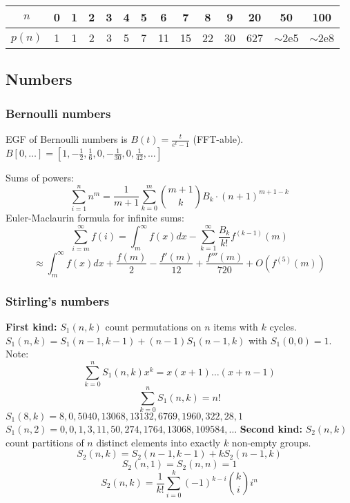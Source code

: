 \documentclass[
	a4paper,
	landscape,
	10pt,
]{article}
\begin{document}
\begin{multicols}{3}
		\begin{center}
		\begin{tabular}{c|c@{\ }c@{\ }c@{\ }c@{\ }c@{\ }c@{\ }c@{\ }c@{\ }c@{\ }c@{\ }c@{\ }c@{\ }c}
			$n$    & 0 & 1 & 2 & 3 & 4 & 5 & 6  & 7  & 8  & 9  & 20  & 50  & 100 \\ \hline
			$p(n)$ & 1 & 1 & 2 & 3 & 5 & 7 & 11 & 15 & 22 & 30 & 627 & $\mathtt{\sim}$2e5 & $\mathtt{\sim}$2e8 \\
		\end{tabular}
		\end{center}
	
	\subsection{Numbers}
	\subsubsection*{Bernoulli numbers}
		EGF of Bernoulli numbers is $B(t)=\frac{t}{e^t-1}$ (FFT-able).
		$B[0,\ldots] = [1, -\frac{1}{2}, \frac{1}{6}, 0, -\frac{1}{30}, 0, \frac{1}{42}, \ldots]$

		Sums of powers:
		\small
		\[ \sum_{i=1}^n n^m = \frac{1}{m+1} \sum_{k=0}^m \binom{m+1}{k} B_k \cdot (n+1)^{m+1-k} \]
		\normalsize
		Euler-Maclaurin formula for infinite sums:
		\small
		\[ \sum_{i=m}^{\infty} f(i) = \int_m^\infty f(x) dx - \sum_{k=1}^\infty \frac{B_k}{k!}f^{(k-1)}(m) \]
		\[ \approx \int_{m}^\infty f(x)dx + \frac{f(m)}{2} - \frac{f'(m)}{12} + \frac{f'''(m)}{720} + O(f^{(5)}(m)) \]
		\normalsize

	\subsubsection*{Stirling's numbers} \textbf{First kind:} $S_1(n, k)$ count permutations on $n$ items
		with $k$ cycles. $S_1(n, k) = S_1(n-1, k-1) + (n-1)S_1(n-1, k)$ with
		$S_1(0, 0) = 1$. Note:
		$$\sum_{k=0}^n S_1(n, k)x^k = x(x+1)\dots(x+n-1)$$
		$$ \sum_{k=0}^n S_1(n, k) = n! $$
		$S_1(8,k) = 8, 0, 5040, 13068, 13132, 6769, 1960, 322, 28, 1$ \\
		$S_1(n,2) = 0, 0, 1, 3, 11, 50, 274, 1764, 13068, 109584, \dots$
		\textbf{Second kind:} $S_2(n, k)$ count partitions of $n$
		distinct elements into exactly $k$ non-empty groups.
		$$ S_2(n, k) = S_2(n-1, k-1) + kS_2(n-1, k)$$
		$$S_2(n, 1) = S_2(n, n) = 1$$
		$$ S_2(n, k) = \frac{1}{k!}\sum_{i=0}^k (-1)^{k-i}\binom{k}{i}i^n $$


\end{multicols}
\end{document}
